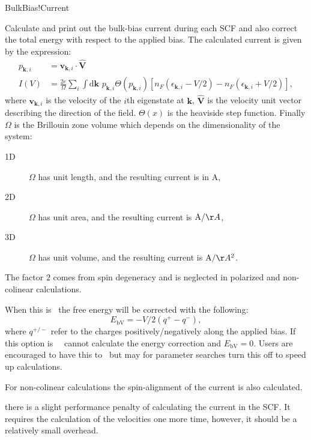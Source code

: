   \begin{fdflogicalT}{BulkBias!Current}
  
    Calculate and print out the bulk-bias current during each SCF and
    also correct the total energy with respect to the applied bias.
    The calculated current is given by the expression:
    \begin{align}
      p_{\mathbf k,i} &=\mathbf{v}_{\mathbf k,i}\cdot \hat{\mathbf V}
      \\
      \label{eq:bulk-bias:current}
      I(V) &= \frac{2e}{\Omega}\sum_i\int\!\!\mathrm{d}\mathbf k\,\,
      p_{\mathbf k,i} \Theta(p_{\mathbf k,i})
      \left[ n_F(\epsilon_{\mathbf k,i} - V/2) - n_F(\epsilon_{\mathbf k,i} + V/2)\right],
    \end{align}
    where $\mathbf{v}_{\mathbf k,i}$ is the velocity of the $i$th
    eigenstate at $\mathbf k$, $\hat{\mathbf V}$ is the velocity unit
    vector describing the direction of the field. $\Theta(x)$ is the
    heaviside step function. Finally $\Omega$ is the Brillouin zone
    volume which depends on the dimensionality of the system:
    \begin{description}
      \item[1D] $\Omega$ has unit length, and the resulting current is
      in $\mathrm A$,
  
      \item[2D] $\Omega$ has unit area, and the resulting current is
      $\mathrm A/\AA$,
  
      \item[3D] $\Omega$ has unit volume, and the resulting current is
      $\mathrm A/\AA^2$.
  
    \end{description}
    The factor $2$ comes from spin degeneracy and is neglected in
    polarized and non-colinear calculations.
  
    When this is \fdftrue\ the free energy will be corrected with the
    following:
    \begin{equation}
      \label{eq:EbV}
      E_{\mathrm{bV}} = - V/2 ( q^+ - q^-),
    \end{equation}
    where $q^{+/-}$ refer to the charges positively/negatively along the
    applied bias. If this option is \fdffalse\ \siesta\ cannot calculate the
    energy correction and $E_{\mathrm{bV}} = 0$. Users are encouraged to
    have this to \fdftrue\ but may for parameter searches turn this off
    to speed up calculations.
  
    For non-colinear calculations the spin-alignment of the current is
    also calculated.
  
    \note there is a slight performance penalty of calculating the
    current in the SCF. It requires the calculation of the velocities
    one more time, however, it should be a relatively small overhead.
  
  \end{fdflogicalT}
  